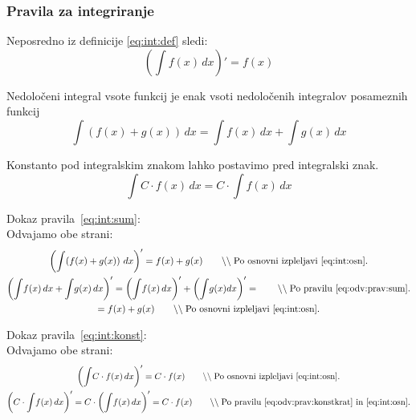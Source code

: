 \documentclass[a4paper,oneside,12pt,fleqn]{article}
\newcommand\krat\cdot
\newcommand{\comment}[1]{\ensuremath{\qquad\backslash\backslash\;}\textnormal{#1}}
\renewcommand{\d}{\ensuremath{\,d}} %
\newcommand{\dx}{\ensuremath{\d x}}
\numberwithin{equation}{section}
\begin{document}
\subsubsection{Pravila za integriranje}
\label{sec:int:prav}
Neposredno iz definicije \eqref{eq:int:def} sledi:
\begin{equation}
  \left( \int\!f(x)\dx \right)' = f(x) \label{eq:int:osn}
\end{equation}

Nedoločeni integral vsote funkcij je enak vsoti nedoločenih integralov posameznih funkcij
\begin{equation}
  \int\!\left( f(x) + g(x) \right)\dx = \int\!f(x)\dx + \int\!g(x)\dx \label{eq:int:sum}
\end{equation}

Konstanto pod integralskim znakom lahko postavimo pred integralski znak.
\begin{equation}
  \int\!C\krat f(x)\dx = C\krat \int\!f(x)\dx \label{eq:int:konst}
\end{equation}

Dokaz pravila~\eqref{eq:int:sum}: \\
Odvajamo obe strani:
\begin{gather*}
  \left( \int\!\left( f(x) + g(x) \right)\dx\right)' = f(x) + g(x) \comment{Po osnovni izpleljavi~\eqref{eq:int:osn}.} \\
  \left( \int\!f(x)\dx + \int\!g(x)\dx \right)' = \left( \int\!f(x)\dx \right)' + \left( \int\!g(x)dx \right)' = \comment{Po pravilu~\eqref{eq:odv:prav:sum}.} \\
  = f(x) + g(x) \comment{Po osnovni izpleljavi~\eqref{eq:int:osn}.}
\end{gather*}

Dokaz pravila~\eqref{eq:int:konst}: \\
Odvajamo obe strani:
\begin{gather*}
  \left( \int\!C\krat f(x)\dx \right)' = C\krat f(x) \comment{Po osnovni izpleljavi~\eqref{eq:int:osn}.} \\
  \left( C\krat \int\!f(x)\dx \right)' = C\krat \left( \int\!f(x)\dx \right)' = C \krat f(x) \comment{Po pravilu~\eqref{eq:odv:prav:konstkrat} in~\eqref{eq:int:osn}.}
\end{gather*}
\end{document}
